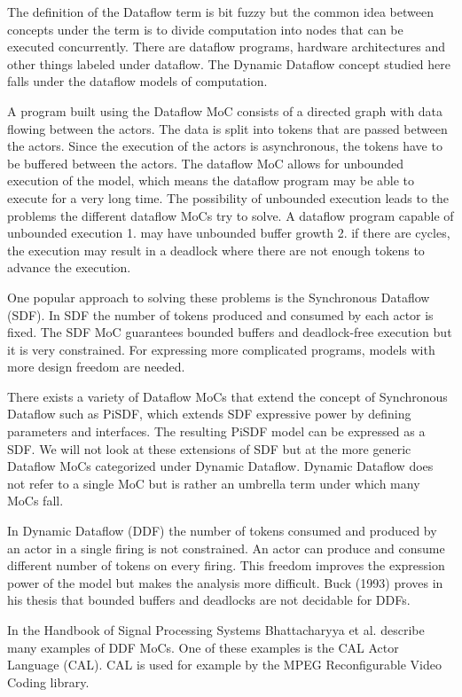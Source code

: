 The definition of the Dataflow term is bit fuzzy but the common idea between concepts under the term is to divide computation into nodes that can be executed concurrently. There are dataflow programs, hardware architectures and other things labeled under dataflow. The Dynamic Dataflow concept studied here falls under the dataflow models of computation.

A program built using the Dataflow MoC consists of a directed graph with data flowing between the actors. The data is split into tokens that are passed between the actors. Since the execution of the actors is asynchronous, the tokens have to be buffered between the actors. The dataflow MoC allows for unbounded execution of the model, which means the dataflow program may be able to execute for a very long time. The possibility of unbounded execution leads to the problems the different dataflow MoCs try to solve. A dataflow program capable of unbounded execution 1. may have unbounded buffer growth 2. if there are cycles, the execution may result in a deadlock where there are not enough tokens to advance the execution.

One popular approach to solving these problems is the Synchronous Dataflow (SDF). In SDF the number of tokens produced and consumed by each actor is fixed.  The SDF MoC guarantees bounded buffers and deadlock-free execution but it is very constrained. For expressing more complicated programs, models with more design freedom are needed.

There exists a variety of Dataflow MoCs that extend the concept of Synchronous Dataflow such as PiSDF, which extends SDF expressive power by defining parameters and interfaces. The resulting PiSDF model can be expressed as a SDF. We will not look at these extensions of SDF but at the more generic Dataflow MoCs categorized under Dynamic Dataflow. Dynamic Dataflow does not refer to a single MoC but is rather an umbrella term under which many MoCs fall.

In Dynamic Dataflow (DDF) the number of tokens consumed and produced by an actor in a single firing is not constrained. An actor can produce and consume different number of tokens on every firing. This freedom improves the expression power of the model but makes the analysis more difficult. Buck (1993) proves in his thesis that bounded buffers and deadlocks are not decidable for DDFs.

In the Handbook of Signal Processing Systems Bhattacharyya et al. describe many examples of DDF MoCs. One of these examples is the CAL Actor Language (CAL). CAL is used for example by the MPEG Reconfigurable Video Coding library.

